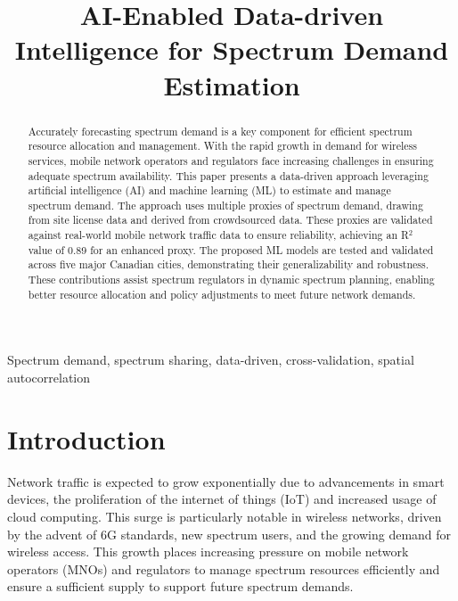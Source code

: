 \documentclass[conference]{IEEEtran}
\begin{document}
\title{AI-Enabled Data-driven Intelligence for Spectrum Demand Estimation\\}

\author{
}

\maketitle

\begin{abstract}
Accurately forecasting spectrum demand is a key component for efficient spectrum resource allocation and management. With the rapid growth in demand for wireless services, mobile network operators and regulators face increasing challenges in ensuring adequate spectrum availability. This paper presents a data-driven approach leveraging artificial intelligence (AI) and machine learning (ML) to estimate and manage spectrum demand. The approach uses multiple proxies of spectrum demand, drawing from site license data and derived from crowdsourced data. These proxies are validated against real-world mobile network traffic data to ensure reliability, achieving an R$^2$ value of 0.89 for an enhanced proxy. The proposed ML models are tested and validated across five major Canadian cities, demonstrating their generalizability and robustness. These contributions assist spectrum regulators in dynamic spectrum planning, enabling better resource allocation and policy adjustments to meet future network demands.
\end{abstract}

\begin{IEEEkeywords}
Spectrum demand, spectrum sharing, data-driven, cross-validation, spatial autocorrelation
\end{IEEEkeywords}



\section{Introduction}\label{sec:introduction}

Network traffic is expected to grow exponentially due to advancements in smart devices, the proliferation of the internet of things (IoT) and increased usage of cloud computing. This surge is particularly notable in wireless networks, driven by the advent of 6G standards, new spectrum users, and the growing demand for wireless access. This growth places increasing pressure on mobile network operators (MNOs) and regulators to manage spectrum resources efficiently and ensure a sufficient supply to support future spectrum demands.
\end{document}
